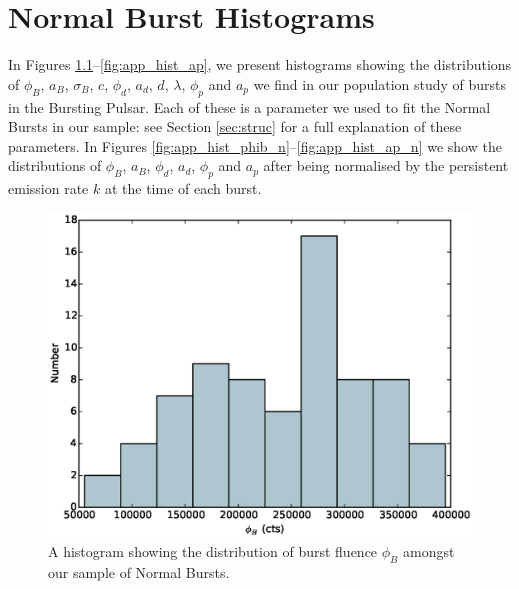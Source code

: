 \chapter{Normal Burst Histograms}
\label{app:hists}

\par In Figures \ref{fig:app_hist_phib}--\ref{fig:app_hist_ap}, we present histograms showing the distributions of $\phi_B$, $a_B$, $\sigma_B$, $c$, $\phi_d$, $a_d$, $d$, $\lambda$, $\phi_p$ and $a_p$ we find in our population study of bursts in the Bursting Pulsar.  Each of these is a parameter we used to fit the Normal Bursts in our sample: see Section \ref{sec:struc} for a full explanation of these parameters.  In Figures \ref{fig:app_hist_phib_n}--\ref{fig:app_hist_ap_n} we show the distributions of $\phi_B$, $a_B$, $\phi_d$, $a_d$, $\phi_p$ and $a_p$ after being normalised by the persistent emission rate $k$ at the time of each burst.

\begin{figure}
  \centering
  \includegraphics[width=.9\linewidth, trim={0cm 0 0cm 0},clip]{images/appendix_burst_aafluence_hist.eps}
  \caption[Histogram showing the distribution of $\phi_B$ amongst Normal Bursts.]{A histogram showing the distribution of burst fluence $\phi_B$ amongst our sample of Normal Bursts.}
  \label{fig:app_hist_phib}
\end{figure}

